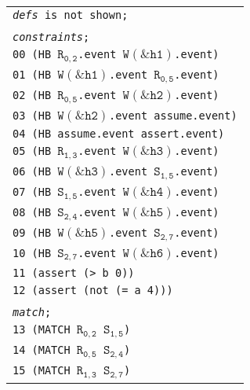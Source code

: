 \newsavebox{\boxSMTb}
\begin{lrbox}{\boxSMTb}
\normalsize
\begin{tabular}[c]{l}
\texttt{\textit{defs} is not shown;}\\
\\
\texttt{\textit{constraints};}\\
\texttt{00 (HB $\mathtt{R_{0,2}}$.event $\mathtt{W(\&h1)}$.event)}\\
\texttt{01 (HB $\mathtt{W(\&h1)}$.event $\mathtt{R_{0,5}}$.event)}\\
\texttt{02 (HB $\mathtt{R_{0,5}}$.event $\mathtt{W(\&h2)}$.event)}\\
\texttt{03 (HB $\mathtt{W(\&h2)}$.event assume.event)}\\
\texttt{04 (HB assume.event assert.event)}\\
\texttt{05 (HB $\mathtt{R_{1,3}}$.event $\mathtt{W(\&h3)}$.event)}\\
\texttt{06 (HB $\mathtt{W(\&h3)}$.event $\mathtt{S_{1,5}}$.event)}\\
\texttt{07 (HB $\mathtt{S_{1,5}}$.event $\mathtt{W(\&h4)}$.event)}\\
\texttt{08 (HB $\mathtt{S_{2,4}}$.event $\mathtt{W(\&h5)}$.event)}\\
\texttt{09 (HB $\mathtt{W(\&h5)}$.event $\mathtt{S_{2,7}}$.event)}\\
\texttt{10 (HB $\mathtt{S_{2,7}}$.event $\mathtt{W(\&h6)}$.event)}\\
\texttt{11 (assert (> b 0))}\\
\texttt{12 (assert (not (= a 4)))}\\
\\
\texttt{\textit{match};}\\
\texttt{13 (MATCH $\mathtt{R_{0,2}}$ $\mathtt{S_{1,5}}$)}\\
\texttt{14 (MATCH $\mathtt{R_{0,5}}$ $\mathtt{S_{2,4}}$)}\\
\texttt{15 (MATCH $\mathtt{R_{1,3}}$ $\mathtt{S_{2,7}}$)}\\

\end{tabular}
\end{lrbox}

